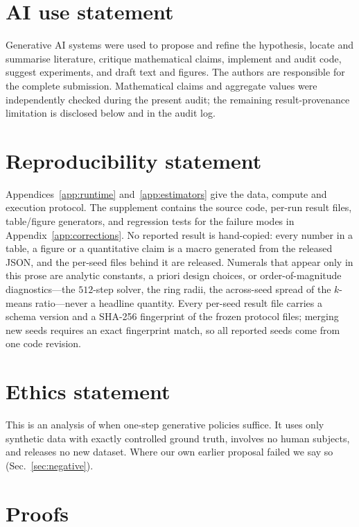 \documentclass{article}
\theoremstyle{plain}
\begin{document}
\section*{AI use statement}
Generative AI systems were used to propose and refine the hypothesis, locate and summarise
literature, critique mathematical claims, implement and audit code, suggest experiments,
and draft text and figures. The authors are responsible for the complete submission.
Mathematical claims and aggregate values were independently checked during the present
audit; the remaining result-provenance limitation is disclosed below and in the audit log.

\section*{Reproducibility statement}
Appendices~\ref{app:runtime} and~\ref{app:estimators} give the data, compute and execution
protocol. The supplement contains the source code, per-run result files, table/figure
generators, and regression tests for the failure modes in
Appendix~\ref{app:corrections}. No reported result is hand-copied: every number in a
table, a figure or a quantitative claim is a macro generated from the released JSON, and
the per-seed files behind it are released. Numerals that appear only in this prose are
analytic constants, a priori design choices, or order-of-magnitude diagnostics---the
$512$-step solver, the ring radii, the across-seed spread of the $k$-means ratio---never a
headline quantity. Every per-seed result file carries a schema version and a
SHA-256 fingerprint of the frozen protocol files; merging new seeds requires an
exact fingerprint match, so all reported seeds come from one code revision.

\section*{Ethics statement}
This is an analysis of when one-step generative policies suffice. It uses only synthetic data
with exactly controlled ground truth, involves no human subjects, and releases no new
dataset. Where our own earlier proposal failed we say so (Sec.~\ref{sec:negative}).




\appendix
\section{Proofs}
\label{app:proofs}
\end{document}
